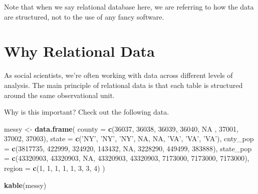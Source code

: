 \documentclass[]{book}
\newenvironment{Shaded}{\begin{snugshade}}{\end{snugshade}}
\newcommand{\KeywordTok}[1]{\textcolor[rgb]{0.13,0.29,0.53}{\textbf{#1}}}
\newcommand{\DataTypeTok}[1]{\textcolor[rgb]{0.13,0.29,0.53}{#1}}
\newcommand{\DecValTok}[1]{\textcolor[rgb]{0.00,0.00,0.81}{#1}}
\newcommand{\StringTok}[1]{\textcolor[rgb]{0.31,0.60,0.02}{#1}}
\newcommand{\OtherTok}[1]{\textcolor[rgb]{0.56,0.35,0.01}{#1}}
\newcommand{\NormalTok}[1]{#1}
\begin{document}
Note that when we say relational database here, we are referring to how
the data are structured, not to the use of any fancy software.

\section{Why Relational Data}\label{why-relational-data}

As social scientists, we're often working with data across different
levels of analysis. The main principle of relational data is that each
table is structured around the same observational unit.

Why is this important? Check out the following data.

\begin{Shaded}
\begin{Highlighting}[]
\NormalTok{messy <-}\StringTok{ }\KeywordTok{data.frame}\NormalTok{(}
  \DataTypeTok{county =} \KeywordTok{c}\NormalTok{(}\DecValTok{36037}\NormalTok{, }\DecValTok{36038}\NormalTok{, }\DecValTok{36039}\NormalTok{, }\DecValTok{36040}\NormalTok{, }\OtherTok{NA}\NormalTok{ , }\DecValTok{37001}\NormalTok{, }\DecValTok{37002}\NormalTok{, }\DecValTok{37003}\NormalTok{),}
  \DataTypeTok{state =} \KeywordTok{c}\NormalTok{(}\StringTok{'NY'}\NormalTok{, }\StringTok{'NY'}\NormalTok{, }\StringTok{'NY'}\NormalTok{, }\OtherTok{NA}\NormalTok{, }\OtherTok{NA}\NormalTok{, }\StringTok{'VA'}\NormalTok{, }\StringTok{'VA'}\NormalTok{, }\StringTok{'VA'}\NormalTok{),}
  \DataTypeTok{cnty_pop =} \KeywordTok{c}\NormalTok{(}\DecValTok{3817735}\NormalTok{, }\DecValTok{422999}\NormalTok{, }\DecValTok{324920}\NormalTok{, }\DecValTok{143432}\NormalTok{, }\OtherTok{NA}\NormalTok{, }\DecValTok{3228290}\NormalTok{, }\DecValTok{449499}\NormalTok{, }\DecValTok{383888}\NormalTok{),}
  \DataTypeTok{state_pop =} \KeywordTok{c}\NormalTok{(}\DecValTok{43320903}\NormalTok{, }\DecValTok{43320903}\NormalTok{, }\OtherTok{NA}\NormalTok{, }\DecValTok{43320903}\NormalTok{, }\DecValTok{43320903}\NormalTok{, }\DecValTok{7173000}\NormalTok{, }\DecValTok{7173000}\NormalTok{, }\DecValTok{7173000}\NormalTok{),}
  \DataTypeTok{region =} \KeywordTok{c}\NormalTok{(}\DecValTok{1}\NormalTok{, }\DecValTok{1}\NormalTok{, }\DecValTok{1}\NormalTok{, }\DecValTok{1}\NormalTok{, }\DecValTok{1}\NormalTok{, }\DecValTok{3}\NormalTok{, }\DecValTok{3}\NormalTok{, }\DecValTok{4}\NormalTok{)}
\NormalTok{)}

\KeywordTok{kable}\NormalTok{(messy)}
\end{Highlighting}
\end{Shaded}
\end{document}
